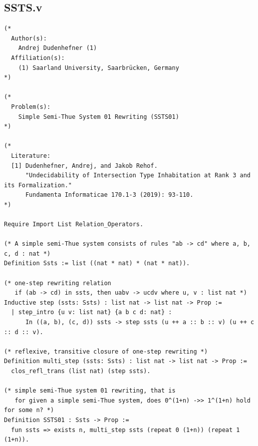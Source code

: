 \subsection*{SSTS.v}
\begin{lstlisting}
(* 
  Author(s):
    Andrej Dudenhefner (1) 
  Affiliation(s):
    (1) Saarland University, Saarbrücken, Germany
*)

(* 
  Problem(s):
    Simple Semi-Thue System 01 Rewriting (SSTS01)
*)

(*
  Literature:
  [1] Dudenhefner, Andrej, and Jakob Rehof. 
      "Undecidability of Intersection Type Inhabitation at Rank 3 and its Formalization." 
      Fundamenta Informaticae 170.1-3 (2019): 93-110.
*)

Require Import List Relation_Operators.

(* A simple semi-Thue system consists of rules "ab -> cd" where a, b, c, d : nat *)
Definition Ssts := list ((nat * nat) * (nat * nat)).

(* one-step rewriting relation 
   if (ab -> cd) in ssts, then uabv -> ucdv where u, v : list nat *)
Inductive step (ssts: Ssts) : list nat -> list nat -> Prop := 
  | step_intro {u v: list nat} {a b c d: nat} : 
      In ((a, b), (c, d)) ssts -> step ssts (u ++ a :: b :: v) (u ++ c :: d :: v).

(* reflexive, transitive closure of one-step rewriting *)
Definition multi_step (ssts: Ssts) : list nat -> list nat -> Prop := 
  clos_refl_trans (list nat) (step ssts).

(* simple semi-Thue system 01 rewriting, that is
   for given a simple semi-Thue system, does 0^(1+n) ->> 1^(1+n) hold for some n? *)
Definition SSTS01 : Ssts -> Prop :=
  fun ssts => exists n, multi_step ssts (repeat 0 (1+n)) (repeat 1 (1+n)).
  
\end{lstlisting}


